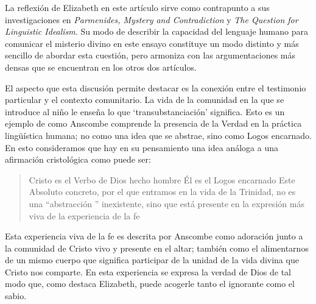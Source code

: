 La reflexión de Elizabeth en este artículo sirve como contrapunto a sus investigaciones en \emph{Parmenides, Mystery and Contradiction} y \emph{The Question for Linguistic Idealism}. Su modo de describir la capacidad del lenguaje humano para comunicar el misterio divino en este ensayo constituye un modo distinto y más sencillo de abordar esta cuestión, pero armoniza con las argumentaciones más densas que se encuentran en los otros dos artículos.

El aspecto que esta discusión permite destacar es la conexión entre el testimonio particular y el contexto comunitario. La vida de la comunidad en la que se introduce al niño le enseña lo que `transubstanciación' significa. Esto es un ejemplo de como Anscombe comprende la presencia de la Verdad en la práctica lingüística humana; no como una idea que se abstrae, sino como Logos encarnado. En esto consideramos que hay en su pensamiento una idea análoga a una afirmación cristológica como puede ser: \blockquote[{\Cite[410-411]{dominguez2009at}}]{Cristo es el Verbo de Dios hecho hombre \textelp{} Él es el Logos encarnado \textelp{} Este Absoluto concreto, por el que entramos en la vida de la Trinidad, no es una ``abstracción '' inexistente, sino que está presente en la expresión más viva de la experiencia de la fe}.
Esta experiencia viva de la fe es descrita por Anscombe como adoración junto a la comunidad de Cristo vivo y presente en el altar; también como el alimentarnos de un mismo cuerpo que significa participar de la unidad de la vida divina que Cristo nos comparte. En esta experiencia se expresa la verdad de Dios de tal modo que, como destaca Elizabeth, puede acogerle tanto el ignorante como el sabio.
